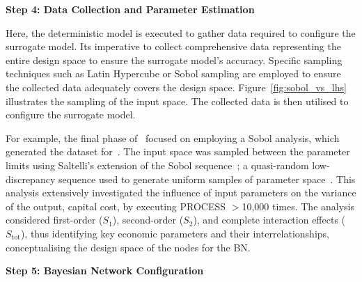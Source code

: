 \documentclass[journal]{IEEEtran}
\begin{document}
\textbf{Step 4: Data Collection and Parameter Estimation}

Here, the deterministic model is executed to gather data required to configure the surrogate model. Its imperative to collect comprehensive data representing the entire design space to ensure the surrogate model's accuracy. Specific sampling techniques such as Latin Hypercube or Sobol sampling are employed to ensure the collected data adequately covers the design space. Figure~\ref{fig:sobol_vs_lhs} illustrates the sampling of the input space. The collected data is then utilised to configure the surrogate model. 

For example, the final phase of~\cite{Hidalgo-Salaverri2023} focused on employing a Sobol analysis, which generated the dataset for~\cite{Griffiths2024}. The input space was sampled between the parameter limits using Saltelli's extension of the Sobol sequence~\cite{Sobol2001, Saltelli2002}; a quasi-random low-discrepancy sequence used to generate uniform samples of parameter space~\cite{Herman2023}. This analysis extensively investigated the influence of input parameters on the variance of the output, capital cost, by executing PROCESS $>$10,000 times. The analysis considered first-order ($S_{1}$), second-order ($S_{2}$), and complete interaction effects ($S_{\text{tot}}$), thus identifying key economic parameters and their interrelationships, conceptualising the design space of the nodes for the BN.\@

\textbf{Step 5: Bayesian Network Configuration}
\end{document}
